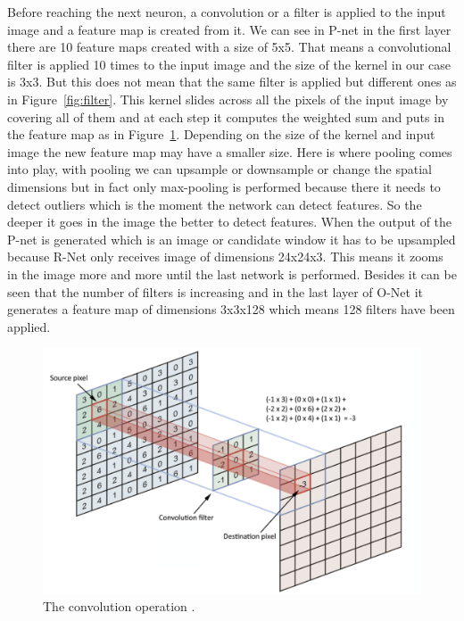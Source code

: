 Before reaching the next neuron, a convolution or a filter is applied to the input image and a feature map is created from it. We can see in P-net in the first layer there are 10 feature maps created with a size of 5x5. That means a convolutional filter is applied 10 times to the input image and the size of the kernel in our case is 3x3. But this does not mean that the same filter is applied but different ones as in Figure~\ref{fig:filter}. This kernel slides across all the pixels of the input image by covering all of them and at each step it computes the weighted sum and puts in the feature map as in Figure~\ref{fig:conv}. Depending on the size of the kernel and input image the new feature map may have a smaller size. Here is where pooling comes into play, with pooling we can upsample or downsample or change the spatial dimensions but in fact only max-pooling is performed because there it needs to detect outliers which is the moment the network can detect features. So the deeper it goes in the image the better to detect features. When the output of the P-net is generated which is an image or candidate window it has to be upsampled because R-Net only receives image of dimensions 24x24x3. This means it zooms in the image more and more until the last network is performed. Besides it can be seen that the number of filters is increasing and in the last layer of O-Net it generates a feature map of dimensions 3x3x128 which means 128 filters have been applied. 
\begin{figure}[!htb]
    \centering
    \includegraphics[width=1\textwidth]{figures/convolution.png}
    \caption{The convolution operation \cite{simpleconvolution}.}
    \label{fig:conv}
\end{figure}


